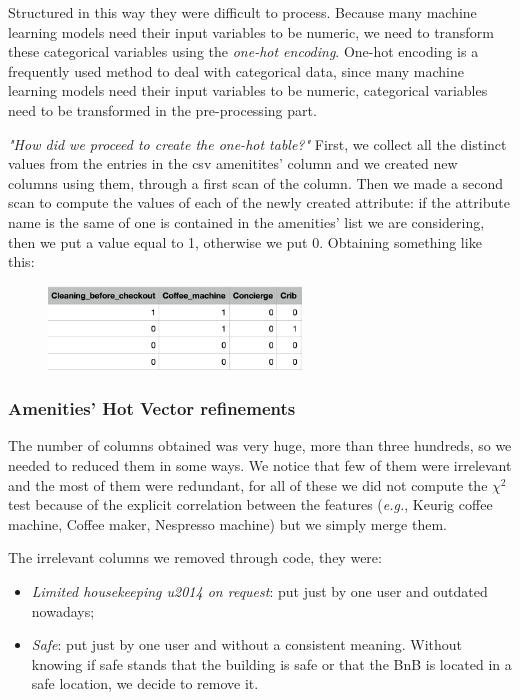 Structured in this way they were difficult to process. Because many machine learning models need their input variables to be numeric, we need to transform these categorical variables using the \textit{one-hot encoding}. One-hot encoding is a frequently used method to deal with categorical data, since many machine learning models need their input variables to be numeric, categorical variables need to be transformed in the pre-processing part.

\textit{"How did we proceed to create the one-hot table?"} First, we collect all the distinct values from the entries in the csv amenitites' column and we created new columns using them, through a first scan of the column. Then we made a second scan to compute the values of each of the newly created attribute: if the attribute name is the same of one is contained in the amenities' list we are considering, then we put a value equal to 1, otherwise we put 0. Obtaining something like this:

\begin{figure}[H]
	\centering
	\includegraphics[width=0.6\textwidth]{img/onehot.png}  
\end{figure}

\subsubsection{Amenities' Hot Vector refinements}
The number of columns obtained was very huge, more than three hundreds, so we needed to reduced them in some ways. We notice that few of them were irrelevant and the most of them were redundant, for all of these we did not compute the $\chi^2$ test because of the explicit correlation between the features (\textit{e.g.}, Keurig coffee machine, Coffee maker, Nespresso machine) but we simply merge them.

The irrelevant columns we removed through code, they were: 
\begin{itemize}
	\item \textit{Limited housekeeping u2014 on request}: put just by one user and outdated nowadays;
	\item \textit{Safe}: put just by one user and without a consistent meaning. Without knowing if safe stands that the building is safe or that the BnB is located in a safe location, we decide to remove it.
\end{itemize}

